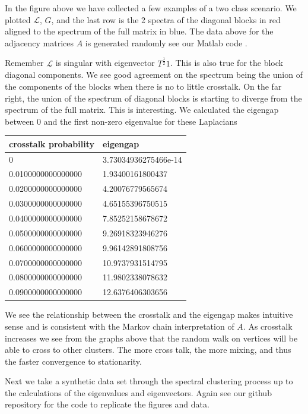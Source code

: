 In the figure above we have collected a few examples of a two class scenario.  We plotted $\mathcal{L}$, $G$, and the last row is the 2 spectra of the diagonal blocks in red aligned to the spectrum of the full matrix in blue.  The data above for the adjacency matrices $A$ is generated randomly see our Matlab code \cite{git_repository}.  

Remember $\mathcal{L}$ is singular with eigenvector $T^{\frac{1}{2}} 1$.  This is also true for the block diagonal components.  We see good agreement on the spectrum being the union of the components of the blocks when there is no to little crosstalk. On the far right, the union of the spectrum of diagonal blocks is starting to diverge from the spectrum of the full matrix.  This is interesting.  We calculated the eigengap between 0 and the first non-zero eigenvalue for these Laplacians

\begin{table}[h!]
\begin{tabular}{ll}
crosstalk probability & eigengap             \\
\hline
0                     & 3.73034936275466e-14 \\
0.0100000000000000    & 1.93400161800437     \\
0.0200000000000000    & 4.20076779565674     \\
0.0300000000000000    & 4.65155396750515     \\
0.0400000000000000    & 7.85252158678672     \\
0.0500000000000000    & 9.26918323946276     \\
0.0600000000000000    & 9.96142891808756     \\
0.0700000000000000    & 10.9737931514795     \\
0.0800000000000000    & 11.9802338078632     \\
0.0900000000000000    & 12.6376406303656    
\end{tabular}
\end{table}

We see the relationship between the crosstalk and the eigengap makes intuitive sense and is consistent with the Markov chain interpretation of $A$.  As crosstalk increases we see from the graphs above that the random walk on vertices will be able to cross to other clusters.  The more cross talk, the more mixing, and thus the faster convergence to stationarity. 

Next we take a synthetic data set through the spectral clustering process up to the calculations of the eigenvalues and eigenvectors. Again see our github repository for the code to replicate the figures and data. 

